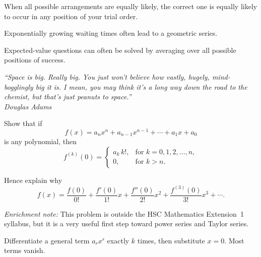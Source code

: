 \begin{takeaways}
\item When all possible arrangements are equally likely, the correct one is equally likely to occur in any position of your trial order.
\item Exponentially growing waiting times often lead to a geometric series.
\item Expected-value questions can often be solved by averaging over all possible positions of success.
\end{takeaways}

\begin{remark}
\begin{center}
\itshape
``Space is big. Really big. You just won't believe how vastly, hugely, mind-bogglingly big it is.
I mean, you may think it's a long way down the road to the chemist, but that's just peanuts to
space.''\\
\normalfont Douglas Adams
\end{center}
\end{remark}

\begin{problem}
Show that if
\[
f(x)=a_nx^n+a_{n-1}x^{n-1}+\cdots+a_1x+a_0
\]
is any polynomial, then
\[
f^{(k)}(0)=
\begin{cases}
a_k\,k!, & \text{for } k=0,1,2,\dots,n,\\
0, & \text{for } k>n.
\end{cases}
\]

Hence explain why
\[
f(x)=\frac{f(0)}{0!}+\frac{f'(0)}{1!}x+\frac{f''(0)}{2!}x^2+\frac{f^{(3)}(0)}{3!}x^3+\cdots.
\]

\noindent\textit{Enrichment note:} This problem is outside the HSC Mathematics Extension~1 syllabus, but it is a very useful first step toward power series and Taylor series.
\end{problem}

\begin{hint}
Differentiate a general term $a_r x^r$ exactly $k$ times, then substitute $x=0$. Most terms vanish.
\end{hint}

